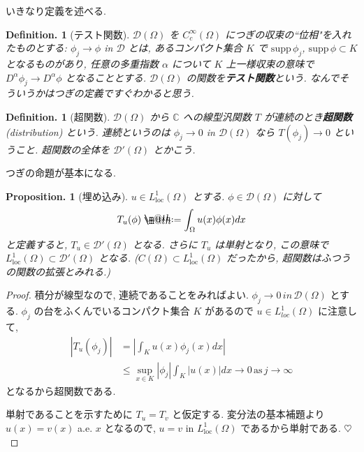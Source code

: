 \documentclass[openany, a4paper, oneside]{book}
\makeatletter
\newcommand*{\defeq}{\mathrel{\rlap{%
\raisebox{0.3ex}{$\m@th\cdot$}}%
\raisebox{-0.3ex}{$\m@th\cdot$}}%
=}
\theoremstyle{break}
\newtheorem{prop}[thm]{Proposition.}
\theoremstyle{breakdefn}
\newtheorem{defn}[thm]{Definition.}
\newcommand{\abs}[1]{\left|#1\right|}
\newcommand{\Loneloc}{L_{\mathrm{loc}}^1}
\newcommand{\supp}{\mathrm{supp} \,}
\makeatother
\begin{document}
いきなり定義を述べる.
\begin{defn}[テスト関数]
 $\mathcal{D}(\Omega)$ を $C_c^{\infty}(\Omega)$ につぎの収束の``位相"を入れたものとする:
 $\phi_j \to \phi$ in $\mathcal{D}$ とは,
 あるコンパクト集合 $K$ で $\supp \phi_j$, $\supp  \phi \subset K$ となるものがあり,
 任意の多重指数 $\alpha$ について $K$ 上一様収束の意味で $D^{\alpha}\phi_j \to D^{\alpha}\phi$ となることとする.
 $\mathcal{D}(\Omega)$ の関数を\textbf{テスト関数}という.
 なんでそういうかはつぎの定義ですぐわかると思う.
\end{defn}
\begin{defn}[超関数]
 $\mathcal{D}(\Omega)$ から $\mathbb{C}$ への線型汎関数
 $T$ が連続のとき\textbf{超関数}(distribution) という.
 連続というのは $\phi_j \to  0$ in $\mathcal{D}(\Omega)$ なら
 $T (\phi_j) \to 0$ ということ.
 超関数の全体を $\mathcal{D}'(\Omega)$ とかこう.
\end{defn}
つぎの命題が基本になる.
\begin{prop}[埋め込み]
 $u \in \Loneloc (\Omega)$ とする.
 $\phi \in \mathcal{D}(\Omega)$ に対して
 \begin{equation}
  T_u (\phi)
  \defeq
  \int_{\Omega}u (x)\phi (x) dx
 \end{equation}
 と定義すると, $T_u \in \mathcal{D}'(\Omega)$ となる.
 さらに $T_u$ は単射となり, この意味で $\Loneloc (\Omega) \subset \mathcal{D}'(\Omega)$ となる.
 ($C (\Omega) \subset \Loneloc (\Omega)$ だったから, 超関数はふつうの関数の拡張とみれる.)
\end{prop}
\begin{proof}
積分が線型なので, 連続であることをみればよい.
$\phi_j \to 0 \, in \, \mathcal{D}(\Omega)$ とする.
$\phi_j$ の台をふくんでいるコンパクト集合 $K$ があるので $u \in L_{loc}^1 (\Omega)$ に注意して,
\begin{equation}
 \begin{split}
  \abs{T_u (\phi_j)}
  &=
  \abs{\int_K u (x)\phi_j (x) dx} \\
  &\le
  \sup_{x \in K} \abs{\phi_j} \int_K \abs{u(x)} dx \to 0 \, \mathrm{as} \, j \to \infty
 \end{split}
\end{equation}
となるから超関数である.

単射であることを示すために $T_u = T_v$ と仮定する.
変分法の基本補題より $u (x ) = v (x)$ a.e. $x$ となるので,
$u = v$ in $\Loneloc (\Omega)$ であるから単射である.
$\heartsuit$
\end{proof}
\end{document}
